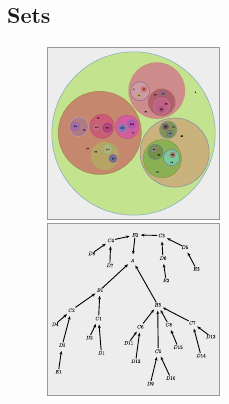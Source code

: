 
\subsection{Sets}
\label{sec:Sets}

\setlength{\columnsep}{1em}
\setlength{\intextsep}{0em}
\begin{figure}
   \includegraphics[width=\linewidth]{assets/penrose/ExponentialGrowth.pdf}
\end{figure}\vspace{-\baselineskip}

